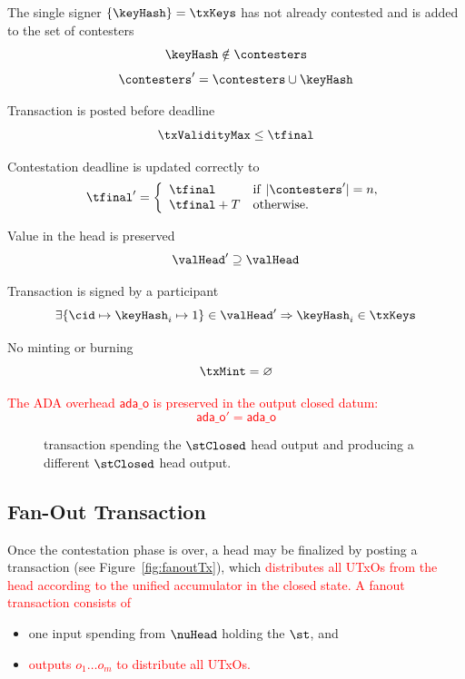 \begin{menumerate}
	\item The single signer $\{\keyHash\} = \txKeys$ has not already contested and is added to the set of contesters
	\[
		\keyHash \notin \contesters
	\]
	\[
		\contesters' = \contesters \cup \keyHash
	\]
	\item Transaction is posted before deadline
	\[
		\txValidityMax \leq \tfinal
	\]
	\item Contestation deadline is updated correctly to
	\[
		\tfinal' = \left\{\begin{array}{ll}
			\tfinal     & \mathrm{if} ~ |\contesters'| = n, \\
			\tfinal + T & \mathrm{otherwise.}
		\end{array}\right.
	\]
	\item Value in the head is preserved
	\[
		\valHead' \supseteq \valHead
	\]
	\item Transaction is signed by a participant
	\[
		\exists \{\cid \mapsto \keyHash_{i} \mapsto 1\} \in \valHead' \Rightarrow \keyHash_{i} \in \txKeys
	\]
	\item No minting or burning
	\[
		\txMint = \varnothing
	\]
	\item \textcolor{red}{The ADA overhead $\mathsf{ada\_o}$ is preserved in the output closed datum:
	\[
		\mathsf{ada\_o}' = \mathsf{ada\_o}
	\]}
\end{menumerate}

\begin{figure}[H]
	\centering
	
	\caption{\mtxContest{} transaction spending the $\stClosed$ head output and
		producing a different $\stClosed$ head output.}\label{fig:contestTx}
\end{figure}

\subsection{Fan-Out Transaction}\label{sec:fanout-tx}

Once the contestation phase is over, a head may be finalized by posting a
\mtxFanout{} transaction (see Figure~\ref{fig:fanoutTx}), which
\textcolor{red}{distributes all UTxOs from the head according to the unified accumulator in the closed state. A fanout transaction consists of}
\begin{itemize}
	\item one input spending from $\nuHead$ holding the $\st$, and
	\item \textcolor{red}{outputs $o_{1} \dots o_{m}$ to distribute all UTxOs.}
\end{itemize}

